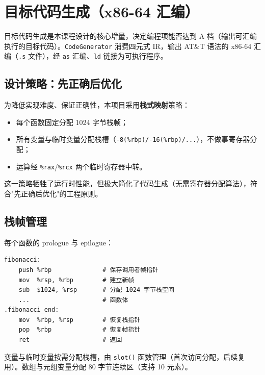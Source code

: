 \documentclass[12pt,a4paper]{ctexart}
\begin{document}
\newpage

\section{目标代码生成（x86-64 汇编）}

目标代码生成是本课程设计的核心增量，决定编程项能否达到 A 档（输出可汇编执行的目标代码）。\texttt{CodeGenerator} 消费四元式 IR，输出 AT\&T 语法的 x86-64 汇编（\texttt{.s} 文件），经 \texttt{as} 汇编、\texttt{ld} 链接为可执行程序。

\subsection{设计策略：先正确后优化}

为降低实现难度、保证正确性，本项目采用\textbf{栈式映射}策略：
\begin{itemize}
    \item 每个函数固定分配 1024 字节栈帧；
    \item 所有变量与临时变量分配栈槽（\texttt{-8(\%rbp)/-16(\%rbp)/...}），不做事寄存器分配；
    \item 运算经 \texttt{\%rax}/\texttt{\%rcx} 两个临时寄存器中转。
\end{itemize}

这一策略牺牲了运行时性能，但极大简化了代码生成（无需寄存器分配算法），符合"先正确后优化"的工程原则。

\subsection{栈帧管理}

每个函数的 prologue 与 epilogue：

\begin{lstlisting}[language=ATnT, caption={函数 prologue 与 epilogue}]
fibonacci:
    push %rbp              # 保存调用者帧指针
    mov  %rsp, %rbp        # 建立新帧
    sub  $1024, %rsp       # 分配 1024 字节栈空间
    ...                    # 函数体
.fibonacci_end:
    mov  %rbp, %rsp        # 恢复栈指针
    pop  %rbp              # 恢复帧指针
    ret                    # 返回
\end{lstlisting}

变量与临时变量按需分配栈槽，由 \texttt{slot()} 函数管理（首次访问分配，后续复用）。数组与元组变量分配 80 字节连续区（支持 10 元素）。
\end{document}
